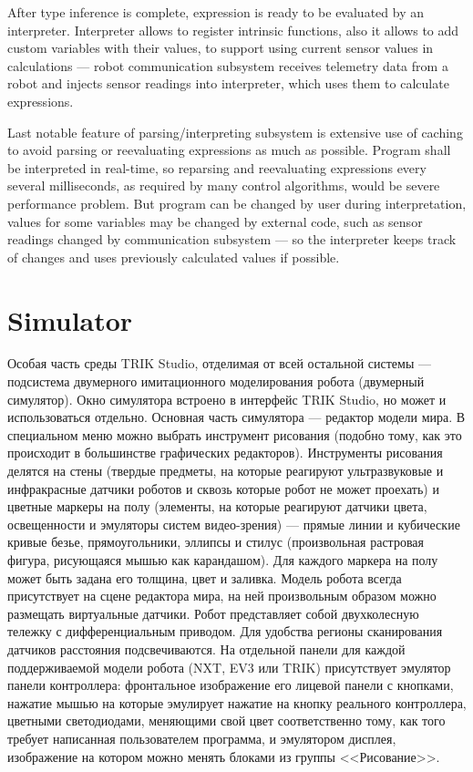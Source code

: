 \documentclass[conference]{IEEEtran}
\begin{document}
{After type inference is complete, expression is ready to be evaluated by an interpreter. Interpreter allows to register intrinsic functions, also it allows to add custom variables with their values, to support using current sensor values in calculations --- robot communication subsystem receives telemetry data from a robot and injects sensor readings into interpreter, which uses them to calculate expressions.

Last notable feature of parsing/interpreting subsystem is extensive use of caching to avoid parsing or reevaluating expressions as much as possible. Program shall be interpreted in real-time, so reparsing and reevaluating expressions every several milliseconds, as required by many control algorithms, would be severe performance problem. But program can be changed by user during interpretation, values for some variables may be changed by external code, such as sensor readings changed by communication subsystem --- so the interpreter keeps track of changes and uses previously calculated values if possible.

\section{Simulator}
\label{chapter:2dModel}

Особая часть среды TRIK Studio, отделимая от всей остальной системы --- подсистема двумерного имитационного моделирования робота (двумерный симулятор). Окно симулятора встроено в интерфейс TRIK Studio, но может и использоваться отдельно. Основная часть симулятора --- редактор модели мира. В специальном меню можно выбрать инструмент рисования (подобно тому, как это происходит в большинстве графических редакторов). Инструменты рисования делятся на стены (твердые предметы, на которые реагируют ультразвуковые и инфракрасные датчики роботов и сквозь которые робот не может проехать) и цветные маркеры на полу (элементы, на которые реагируют датчики цвета, освещенности и эмуляторы систем видео-зрения) --- прямые линии и кубические кривые безье, прямоугольники, эллипсы и стилус (произвольная растровая фигура, рисующаяся мышью как карандашом). Для каждого маркера на полу может быть задана его толщина, цвет и заливка. Модель робота всегда присутствует на сцене редактора мира, на ней произвольным образом можно размещать виртуальные датчики. Робот представляет собой двухколесную тележку с дифференциальным приводом. Для удобства регионы сканирования датчиков расстояния подсвечиваются. На отдельной панели для каждой поддерживаемой модели робота (NXT, EV3 или TRIK) присутствует эмулятор панели контроллера: фронтальное изображение его лицевой панели с кнопками, нажатие мышью на которые эмулирует нажатие на кнопку реального контроллера, цветными светодиодами, меняющими свой цвет соответственно тому, как того требует написанная пользователем программа, и эмулятором дисплея, изображение на котором можно менять блоками из группы <<Рисование>>.

}
\end{document}
